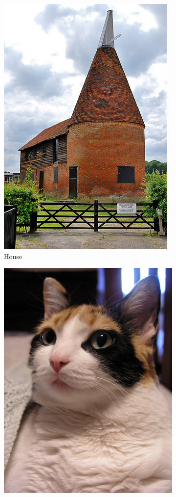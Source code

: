 \documentclass[pageno]{jpaper}
\begin{document}
\begin{figure}
\centering
\begin{subfigure}{.2\textwidth}
  \centering
  \includegraphics[scale=0.1]{classTypeExample1.jpg}
  \caption{House}
\end{subfigure}%
\begin{subfigure}{.2\textwidth}
  \centering
  \includegraphics[scale=0.14]{classTypeExample2.jpg}

\end{subfigure}
\end{figure}
\end{document}
